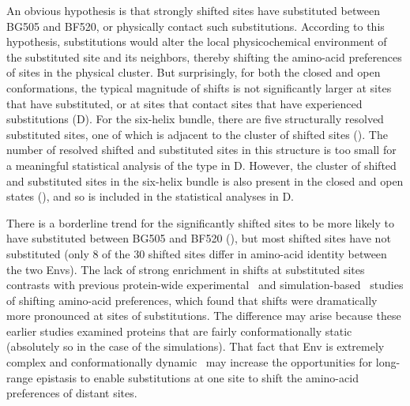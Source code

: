 \documentclass[9pt]{elife}
\begin{document}
An obvious hypothesis is that strongly shifted sites have substituted between BG505 and BF520, or physically contact such substitutions.
According to this hypothesis, substitutions would alter the local physicochemical environment of the substituted site and its neighbors, thereby shifting the amino-acid preferences of sites in the physical cluster.
But surprisingly, for both the closed and open conformations, the typical magnitude of shifts is not significantly larger at sites that have substituted, or at sites that contact sites that have experienced substitutions (D).
For the six-helix bundle, there are five structurally resolved substituted sites, one of which is adjacent to the cluster of shifted sites ().
The number of resolved shifted and substituted sites in this structure is too small for a meaningful statistical analysis of the type in D.
However, the cluster of shifted and substituted sites in the six-helix bundle is also present in the closed and open states (), and so is included in the statistical analyses in D.

There is a borderline trend for the significantly shifted sites to be more likely to have substituted between BG505 and BF520 (), but most shifted sites have not substituted (only 8 of the 30 shifted sites differ in amino-acid identity between the two Envs).
The lack of strong enrichment in shifts at substituted sites contrasts with previous protein-wide experimental~\citep{doud2015site} and simulation-based~\citep{pollock2012amino,shah2015contingency} studies of shifting amino-acid preferences, which found that shifts were dramatically more pronounced at sites of substitutions.
The difference may arise because these earlier studies examined proteins that are fairly conformationally static (absolutely so in the case of the simulations).
That fact that Env is extremely complex and conformationally dynamic~\citep{munro2014conformational,ozorowski2017open} may increase the opportunities for long-range epistasis to enable substitutions at one site to shift the amino-acid preferences of distant sites.
\end{document}
